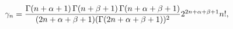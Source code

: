 $\gamma_{n}=\dfrac{\mathop{\Gamma\/}\nolimits\!\left(n+\alpha+1\right)\mathop{%
\Gamma\/}\nolimits\!\left(n+\beta+1\right)\mathop{\Gamma\/}\nolimits\!\left(n+%
\alpha+\beta+1\right)}{(2n+\alpha+\beta+1)(\mathop{\Gamma\/}\nolimits\!\left(2%
n+\alpha+\beta+1\right))^{2}}2^{2n+\alpha+\beta+1}n!,$
